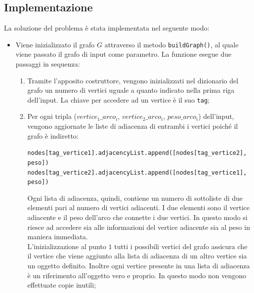 \subsection{Implementazione}

	La soluzione del problema è stata implementata nel seguente modo:
	
	\begin{itemize}
		\item Viene inizializzato il grafo $G$ attraverso il metodo \texttt{buildGraph()}, al quale viene passato il grafo di input come parametro. 
		La funzione esegue due passaggi in sequenza:
		\begin{enumerate}
			\item Tramite l'apposito costruttore, vengono inizializzati nel dizionario del grafo un numero di vertici uguale a quanto indicato nella prima riga dell'input. La chiave per accedere ad un vertice è il suo \texttt{tag};
			\item Per ogni tripla ($vertice_1\_arco_i$, $vertice_2\_arco_i$, $peso\_arco_i$) dell'input, vengono aggiornate le liste di adiacenza di entrambi i vertici poiché il grafo è indiretto:
			
			\texttt{nodes[tag\_vertice1].adjacencyList.append([nodes[tag\_vertice2], peso])}
			\texttt{nodes[tag\_vertice2].adjacencyList.append([nodes[tag\_vertice1], peso])}
			
			Ogni lista di adiacenza, quindi, contiene un numero di sottoliste di due elementi pari al numero di vertici adiacenti. 
			I due elementi sono il vertice adiacente e il peso dell'arco che connette i due vertici. 
			In questo modo si riesce ad accedere sia alle informazioni del vertice adiacente sia al peso in maniera immediata.\\
			L'inizializzazione al punto $1$ tutti i possibili vertici del grafo assicura che il vertice che viene aggiunto alla lista di adiacenza di un altro vertice sia un oggetto definito. 
			Inoltre ogni vertice presente in una lista di adiacenza è un riferimento all'oggetto vero e proprio. 
			In questo modo non vengono effettuate copie inutili;
		\end{enumerate}
	

\end{itemize}

